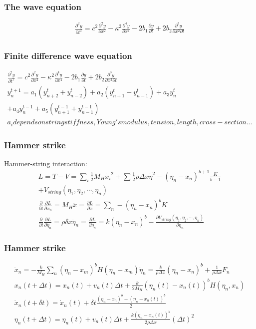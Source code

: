 \documentclass{beamer}
\begin{document}
\begin{frame}\frametitle{The wave equation}
	\begin{gather*}
	\frac{\partial^2 y}{\partial t^2} = c^2\frac{\partial^2 y}{\partial x^2}-\kappa^2\frac{\partial^4y}{\partial x^4}-2b_1\frac{\partial y}{\partial t} + 2b_2 \frac{\partial^3y}{\partial x^2\partial t}\\
\end{gather*}
\end{frame}

\begin{frame}\frametitle{Finite difference wave equation}
	\begin{gather*}
	\frac{\partial^2 y}{\partial t^2} = c^2\frac{\partial^2 y}{\partial x^2}-\kappa^2\frac{\partial^4y}{\partial x^4}-2b_1\frac{\partial y}{\partial t} + 2b_2 \frac{\partial^3y}{\partial x^2\partial t}\\
y_n^{t+1} = a_1\left(y_{n+2}^t+y_{n-2}^t\right)+a_2\left(y_{n+1}^t+y_{n-1}^t\right)+a_3y_n^t\\
+a_4y_n^{t-1}+a_5\left(y_{n+1}^{t-1}+y_{n-1}^{t-1}\right)\\
a_i depends on string stiffness, Young's modulus, tension, length, cross-section...
\end{gather*}
\end{frame}


\begin{frame}\frametitle{Hammer strike}
Hammer-string interaction:\\

\begin{gather*}
L = T - V = \sum_i \frac{1}{2}M_H\dot{x_i}^2+\sum\frac{1}{2}\rho \Delta x \dot{\eta}^2-(\eta_n-x_n)^{b+1}\frac{K}{b-1}\\+V_{string}\left(\eta_1,\eta_2,\cdots, \eta_n\right)\\
\frac{\partial}{\partial t}\frac{\partial L}{\partial \dot{x}_n} = M_H\ddot{x} = \frac{\partial L}{\partial x} = \sum_n-\left(\eta_n-x_ n\right)^bK\\
\frac{\partial}{\partial t}\frac{\partial L}{\partial \dot{\eta}_n} = \rho \delta x \ddot{\eta}_n = \frac{\partial L}{\partial \dot{\eta}_n} = k(\eta_n-x_n)^b - \frac{\partial V_{string}\left(\eta_1,\eta_2,\cdots, \eta_n\right)}{\partial \eta_n}
\end{gather*}
\end{frame}

\begin{frame}\frametitle{Hammer strike}
\begin{gather*}
\ddot{x}_n = -\frac{k}{M_H}\sum_n (\eta_n-x_m)^bH(\eta_n-x_m)\ddot{\eta}_n = \frac{k}{\rho\Delta x}\left(\eta_n-x_n\right)^b+\frac{1}{\rho\Delta x}F_n\\
x_n(t+\Delta t) = x_n(t) + v_n(t)\Delta t + \frac{k}{2M_H}\left(\eta_n(t)-x_n(t)\right)^bH(\eta_n,x_n)\\
\dot{x}_n(t+\delta t) = \dot{x}_n(t) + \delta t \frac{\left(\eta_n-x_n\right)^b+\left(\eta_n-x_n(t)\right)^b}{2}\\
\eta_n(t+\Delta t) = \eta_n(t) + v_n(t)\Delta t + \frac{k\left(\eta_n-x_n(t)\right)^b}{2\rho \Delta x}\left(\Delta t\right)^2
\end{gather*}
\end{frame}
\end{document}

